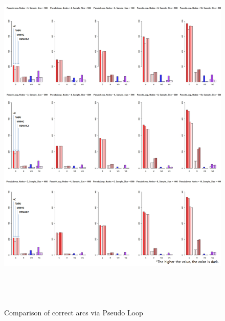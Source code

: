 	\begin{figure}[p]
	\centering
		\includegraphics[height=500pt]{04_PseudoLoop_Arcs}
		\caption{Comparison of correct arcs via Pseudo Loop}
	\end{figure}	
